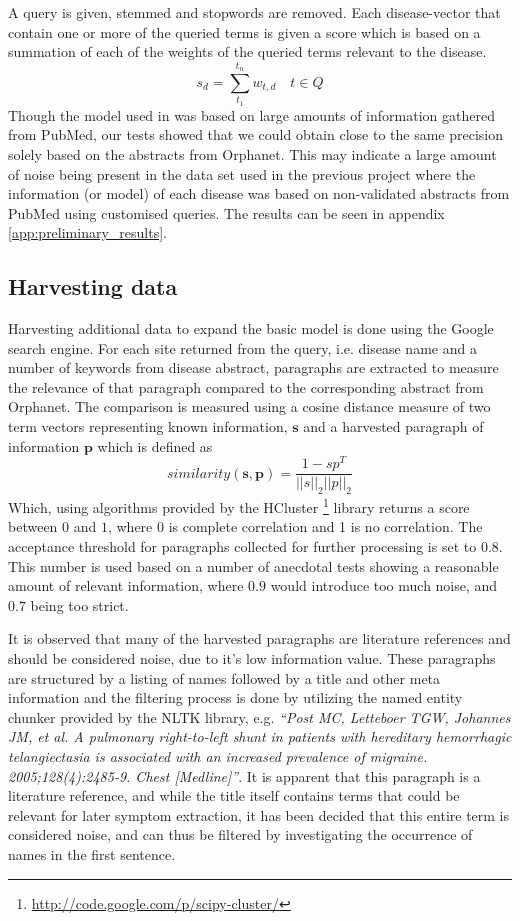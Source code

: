 \documentclass[10pt,letterpaper,final]{article}
\begin{document}
A query is given, stemmed and stopwords are removed. Each
disease-vector that contain one or more of the queried terms is given a
score which is based on a summation of each of the weights of the
queried terms relevant to the disease. 
\[
s_{d} = \displaystyle\sum\limits_{t_1}^{t_n} w_{t,d}\quad t \in Q
\]
Though the model used in \cite{jensenandersen} was based on large
amounts of information gathered from PubMed, our tests showed that we
could obtain close to the same precision solely based on the abstracts
from Orphanet. This may indicate a large amount of noise being present
in the data set used in the previous project where the information (or
model) of each disease was based on non-validated abstracts from PubMed
using customised queries. The results can be seen in appendix
\ref{app:preliminary_results}.


\subsection{Harvesting data}
Harvesting additional data to expand the basic model is done using the
Google search engine. For each site returned from the query, i.e.
disease name and a number of keywords from disease abstract, paragraphs
are extracted to measure the relevance of that paragraph compared to the
corresponding abstract from Orphanet. The comparison is measured using a
cosine distance measure of two term vectors representing known
information, $\textbf{s}$ and a harvested paragraph of information
$\textbf{p}$ which is defined as
\[
similarity(\textbf{s}, \textbf{p}) = \frac{1 - sp^T}{||s||_2 ||p||_2}
\]
Which, using algorithms provided by the HCluster
\footnote{\url{http://code.google.com/p/scipy-cluster/}} library returns
a score between $0$ and $1$, where 0 is complete correlation and 1 is
no correlation. The acceptance threshold for paragraphs collected for
further processing is set to $0.8$. This number is used based on a
number of anecdotal tests showing a reasonable amount of relevant
information, where $0.9$ would introduce too much noise, and $0.7$ being
too strict.

It is observed that many of the harvested paragraphs are literature
references and should be considered noise, due to it's low information
value.
These paragraphs are structured by a listing of names followed by a
title and other meta information and the filtering process is done by
utilizing the named entity chunker provided by the NLTK library, e.g.
\textit{``Post MC, Letteboer TGW, Johannes JM, et al. A pulmonary
right-to-left shunt in patients with hereditary hemorrhagic
telangiectasia is associated with an increased prevalence of migraine.
2005;128(4):2485-9. Chest [Medline]''}. It is apparent that this paragraph
is a literature reference, and while the title itself contains terms
that could be relevant for later symptom extraction, it has been decided
that this entire term is considered noise, and can thus be filtered by
investigating the occurrence of names in the first sentence.
\end{document}
